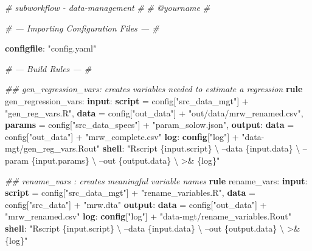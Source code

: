 \documentclass[]{book}
\newenvironment{Shaded}{\begin{snugshade}}{\end{snugshade}}
\newcommand{\KeywordTok}[1]{\textcolor[rgb]{0.13,0.29,0.53}{\textbf{{#1}}}}
\newcommand{\StringTok}[1]{\textcolor[rgb]{0.31,0.60,0.02}{{#1}}}
\newcommand{\CommentTok}[1]{\textcolor[rgb]{0.56,0.35,0.01}{\textit{{#1}}}}
\newcommand{\NormalTok}[1]{{#1}}
\theoremstyle{definition}
\theoremstyle{definition}
\theoremstyle{definition}
\theoremstyle{remark}
\begin{document}
\begin{Shaded}
\begin{Highlighting}[]
\CommentTok{# subworkflow - data-management}
\CommentTok{#}
\CommentTok{# @yourname}
\CommentTok{#}

\CommentTok{# --- Importing Configuration Files --- #}

\KeywordTok{configfile}\NormalTok{: }\StringTok{"config.yaml"}

\CommentTok{# --- Build Rules --- #}

\CommentTok{## gen_regression_vars: creates variables needed to estimate a regression}
\KeywordTok{rule} \NormalTok{gen_regression_vars:}
    \KeywordTok{input}\NormalTok{:}
        \KeywordTok{script} \NormalTok{= config[}\StringTok{"src_data_mgt"}\NormalTok{] + }\StringTok{"gen_reg_vars.R"}\NormalTok{,}
        \KeywordTok{data}   \NormalTok{= config[}\StringTok{"out_data"}\NormalTok{] + }\StringTok{"out/data/mrw_renamed.csv"}\NormalTok{,}
        \KeywordTok{params} \NormalTok{= config[}\StringTok{"src_data_specs"}\NormalTok{] + }\StringTok{"param_solow.json"}\NormalTok{,}
    \KeywordTok{output}\NormalTok{:}
        \KeywordTok{data} \NormalTok{= config[}\StringTok{"out_data"}\NormalTok{] + }\StringTok{"mrw_complete.csv"}
    \KeywordTok{log}\NormalTok{:}
        \KeywordTok{config}\NormalTok{[}\StringTok{"log"}\NormalTok{] + }\StringTok{"data-mgt/gen_reg_vars.Rout"}
    \KeywordTok{shell}\NormalTok{:}
        \StringTok{"Rscript \{input.script\} \textbackslash{}}
\StringTok{            --data \{input.data\} \textbackslash{}}
\StringTok{            --param \{input.params\} \textbackslash{}}
\StringTok{            --out \{output.data\} \textbackslash{}}
\StringTok{            >& \{log\}"}

\CommentTok{## rename_vars        : creates meaningful variable names}
\KeywordTok{rule} \NormalTok{rename_vars:}
    \KeywordTok{input}\NormalTok{:}
        \KeywordTok{script} \NormalTok{= config[}\StringTok{"src_data_mgt"}\NormalTok{] + }\StringTok{"rename_variables.R"}\NormalTok{,}
        \KeywordTok{data}   \NormalTok{= config[}\StringTok{"src_data"}\NormalTok{] + }\StringTok{"mrw.dta"}
    \KeywordTok{output}\NormalTok{:}
        \KeywordTok{data} \NormalTok{= config[}\StringTok{"out_data"}\NormalTok{] + }\StringTok{"mrw_renamed.csv"}
    \KeywordTok{log}\NormalTok{:}
        \KeywordTok{config}\NormalTok{[}\StringTok{"log"}\NormalTok{] + }\StringTok{"data-mgt/rename_variables.Rout"}
    \KeywordTok{shell}\NormalTok{:}
        \StringTok{"Rscript \{input.script\} \textbackslash{}}
\StringTok{            --data \{input.data\} \textbackslash{}}
\StringTok{            --out \{output.data\} \textbackslash{}}
\StringTok{            >& \{log\}"}
\end{Highlighting}
\end{Shaded}
\end{document}
